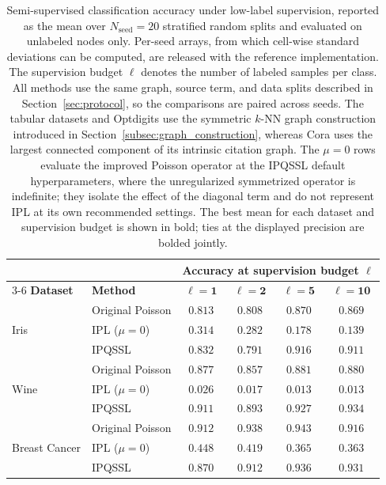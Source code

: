 \documentclass[11pt,a4paper]{article}
\begin{document}
\begin{table}[H]
\centering
\small
\setlength{\tabcolsep}{4.5pt}
\caption{
Semi-supervised classification accuracy under low-label supervision,
reported as the mean over \(N_{\mathrm{seed}}=20\)
stratified random splits and evaluated on unlabeled nodes only.
Per-seed arrays, from which cell-wise standard deviations can be
computed, are released with the reference implementation.
The
supervision budget \(\ell\) denotes the number of labeled samples per
class. All methods use the same graph, source term, and data splits
described in Section~\ref{sec:protocol}, so the comparisons are paired
across seeds. The tabular datasets
and Optdigits use the symmetric \(k\)-NN graph construction introduced in
Section~\ref{subsec:graph_construction}, whereas Cora uses the largest
connected component of its intrinsic citation graph. The \(\mu=0\) rows
evaluate the improved Poisson operator at the IPQSSL default
hyperparameters, where the unregularized symmetrized operator is
indefinite; they isolate the effect of the
diagonal term and do not represent IPL at its own recommended settings.
The best mean for each dataset and supervision budget is shown in bold;
ties at the displayed precision are bolded jointly.
}
\label{tab:low-label-results}
\begin{tabular}{@{}llcccc@{}}
\toprule
& & \multicolumn{4}{c}{Accuracy at supervision budget \(\ell\)} \\
\cmidrule(lr){3-6}
\textbf{Dataset}
& \textbf{Method}
& \(\boldsymbol{\ell=1}\)
& \(\boldsymbol{\ell=2}\)
& \(\boldsymbol{\ell=5}\)
& \(\boldsymbol{\ell=10}\) \\
\midrule

\multirow{3}{*}{Iris}
& Original Poisson
& $0.813$ & $\mathbf{0.808}$ & $0.870$ & $0.869$ \\
& IPL (\(\mu=0\))
& $0.314$ & $0.282$ & $0.178$ & $0.139$ \\
& \textsc{IPQSSL}
& $\mathbf{0.832}$ & $0.791$ & $\mathbf{0.916}$ & $\mathbf{0.911}$ \\
\midrule

\multirow{3}{*}{Wine}
& Original Poisson
& $0.877$ & $0.857$ & $0.881$ & $0.880$ \\
& IPL (\(\mu=0\))
& $0.026$ & $0.017$ & $0.013$ & $0.013$ \\
& \textsc{IPQSSL}
& $\mathbf{0.911}$ & $\mathbf{0.893}$ & $\mathbf{0.927}$ & $\mathbf{0.934}$ \\
\midrule

\multirow{3}{*}{Breast Cancer}
& Original Poisson
& $\mathbf{0.912}$ & $\mathbf{0.938}$ & $\mathbf{0.943}$ & $0.916$ \\
& IPL (\(\mu=0\))
& $0.448$ & $0.419$ & $0.365$ & $0.363$ \\
& \textsc{IPQSSL}
& $0.870$ & $0.912$ & $0.936$ & $\mathbf{0.931}$ \\
\midrule


\end{tabular}
\end{table}
\end{document}
